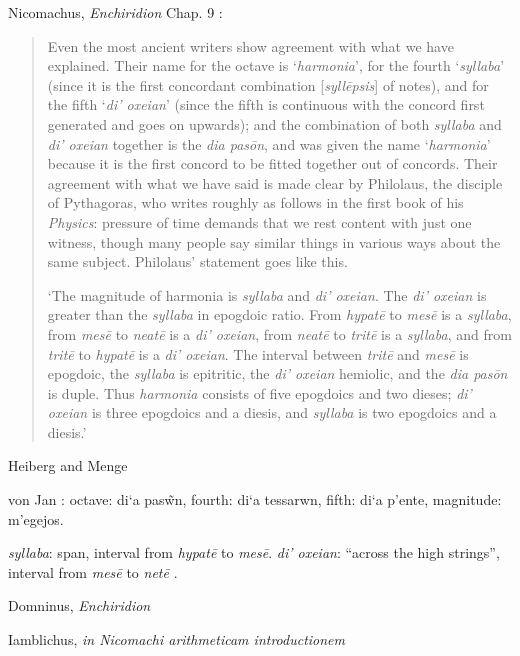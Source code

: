 \documentclass{amsart}
\newcommand{\textgreek}[1]{\begingroup\fontencoding{LGR}\selectfont#1\endgroup}
\theoremstyle{definition}
\begin{document}
Nicomachus, {\em Enchiridion} Chap. 9 \cite[p.~261]{barker}:

\begin{quote}
Even the most ancient writers show agreement with what we have explained.
Their name for the octave is `{\em harmonia}', for the fourth `{\em syllaba}' (since it is the
first concordant combination [{\em syll\={e}psis}] of notes), and for the fifth `{\em di' oxeian}'
(since the fifth is continuous with the concord first generated and goes on
upwards); and the combination of both {\em syllaba} and {\em di' oxeian} together is the
{\em dia pas\={o}n}, and was given the name `{\em harmonia}' because it is the first concord
to be fitted together out of concords. Their agreement with what we have said
is made clear by Philolaus, the disciple of Pythagoras, who writes roughly as
follows in the first book of his {\em Physics}: pressure of time demands that we rest
content with just one witness, though many people say similar things in various
ways about the same subject. Philolaus' statement goes like this.

`The magnitude of harmonia is {\em syllaba} and {\em di' oxeian}. The {\em di' oxeian} is
greater than the {\em syllaba} in epogdoic ratio. From {\em hypat\={e}} to {\em mes\={e}}
is a {\em syllaba},
from {\em mes\={e}} to {\em neat\={e}} is a {\em di' oxeian}, from {\em neat\={e}} to
{\em trit\={e}} is a {\em syllaba}, and from {\em trit\={e}}
to {\em hypat\={e}} is a {\em di' oxeian}. The interval between {\em trit\={e}}
and {\em mes\={e}} is epogdoic, the
{\em syllaba} is epitritic, the {\em di' oxeian} hemiolic, and the {\em dia pas\={o}n} is duple. Thus
{\em harmonia} consists of five epogdoics and two dieses; {\em di' oxeian} is three
epogdoics and a diesis, and {\em syllaba} is two epogdoics and a diesis.'
\end{quote}

Heiberg and Menge \cite{euclidVIII}

von Jan \cite[p.~252]{MSG}: octave: \textgreek{di`a pas\~wn}, 
fourth: \textgreek{di`a tessarwn},
fifth: \textgreek{di`a p'ente},
magnitude: \textgreek{m'egejos}.

{\em syllaba}: span, interval from {\em hypat\={e}} to {\em mes\={e}}.
{\em di' oxeian}: ``across the high strings'', interval from {\em mes\={e}} to {\em net\={e}} \cite[p.~219]{west}.

Domninus, {\em Enchiridion} \cite{domninus}

Iamblichus, {\em in Nicomachi arithmeticam introductionem} \cite{iamblichus}
\end{document}
